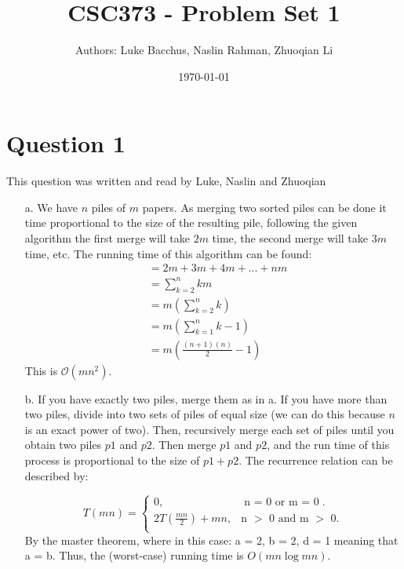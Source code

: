 \documentclass[12pt]{article}
\title{\textbf{CSC373 - Problem Set 1}}
\author{Authors: Luke Bacchus, Naslin Rahman, Zhuoqian Li}
\date{\today}
\begin{document}
\maketitle
\section*{Question 1}
This question was written and read by Luke, Naslin and Zhuoqian
\begin{enumerate}
    \item[a.] We have $n$ piles of $m$ papers. As merging two sorted piles can be done it time proportional to the size of the resulting pile, following the given algorithm the first merge will take $2m$ time, the second merge will take $3m$ time, etc. 
    The running time of this algorithm can be found:
    \begin{align*}
        &= 2m + 3m + 4m + ... + nm \\
        &= \sum_{k=2}^n km \\
        &= m(\sum_{k=2}^n k) \\
        &= m(\sum_{k=1}^n k-1) \\
        &= m(\frac{(n+1)(n)}{2} - 1)
    \end{align*}
    This is $\mathcal{O}(mn^2)$.
    \item[b.] If you have exactly two piles, merge them as in a. If you have more than two piles, divide into two sets of piles of equal size (we can do this because $n$ is an exact power of two). 
    Then, recursively merge each set of piles until you obtain two piles $p1$ and $p2$. Then merge $p1$ and $p2$, and the run time of this process is proportional to the size of $p1 + p2$. The recurrence relation can be described by:
    
    \begin{equation}
        T(mn) = \begin{cases}
          0, & \text{n = 0 or m $=$ 0}.\\
          2T(\frac{mn}{2}) + mn, & \text{n $>$ 0 and m $>$ 0}.\\
    \end{cases}
    \end{equation}
By the master theorem, where in this case: a = 2, b = 2, d = 1 meaning that a = b. Thus, the (worst-case) running time is $O(mn \log mn)$.\end{enumerate} 
\newpage
\end{document}
